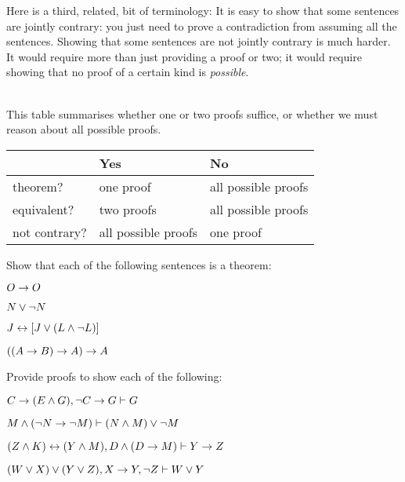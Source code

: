 Here is a third, related, bit of terminology:
It is easy to show that some sentences are jointly contrary: you just need to prove a contradiction from assuming all the sentences. Showing that some sentences are not jointly contrary is much harder. It would require more than just providing a proof or two; it would require showing that no proof of a certain kind is \emph{possible}.

\
\\
This table summarises whether one or two proofs suffice, or whether we must reason about all possible proofs.

\begin{center}
\begin{tabular}{l l l}
 & \textbf{Yes} & \textbf{No}\\
 \hline
theorem? & one proof & all possible proofs\\
equivalent? & two proofs & all possible proofs\\
not contrary? & all possible proofs & one proof\\
\end{tabular}
\end{center}


\practiceproblems
\problempart
Show that each of the following sentences is a theorem:
\begin{earg}
\item $O \rightarrow O$
\item $N \vee \neg N$
\item $J \leftrightarrow [J\vee (L\wedge\neg L)]$
\item $((A \rightarrow B) \rightarrow A) \rightarrow A$ 
\end{earg}

\problempart
Provide proofs to show each of the following:
\begin{earg}
\item $C\rightarrow(E\wedge G), \neg C \rightarrow G \vdash G$
\item $M \wedge (\neg N \rightarrow \neg M) \vdash (N \wedge M) \vee \neg M$
\item $(Z\wedge K)\leftrightarrow(Y\wedge M), D\wedge(D\rightarrow M) \vdash Y\rightarrow Z$
\item $(W \vee X) \vee (Y \vee Z), X\rightarrow Y, \neg Z \vdash W\vee Y$
\end{earg}

